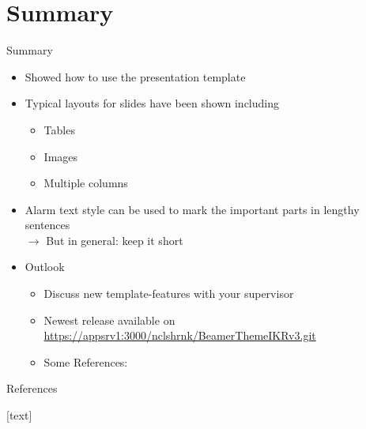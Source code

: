 \documentclass[english,american,german,aspectratio=169]{beamer}
\begin{document}
\section{Summary}
\begin{frame}{Summary}

  \begin{itemize}
    \item Showed how to use the \alert{presentation template}
    \item \alert{Typical layouts} for slides have been shown including

      \begin{itemize}
        \item Tables
        \item Images
        \item Multiple columns
      \end{itemize}
    \item Alarm text style can be used to mark the \alert{important parts}
      in lengthy sentences\\
      $\mathit{\rightarrow}$ But in general: keep it short
  \end{itemize}
  \medskip{}

  \begin{itemize}
    \item Outlook

      \begin{itemize}
        \item Discuss new template-features with your supervisor
        \item Newest release available on
          \url{https://appsrv1:3000/nclshrnk/BeamerThemeIKRv3.git}
        \item Some References:
          \cite{Kuo:1981,IEEE:14/1193r0,IEEE:15/0919r1,Jones:2015,Ling:2015,Yang:2015,Zhang:2015}
      \end{itemize}
  \end{itemize}
\end{frame}
\breadcrumbsoff

\begin{frame}[noframenumbering]{References}

  \vspace{-2.15em}
  \begin{multicols}{2}
    [text]

    {\scriptsize{}
      
    }{\scriptsize\par}

  \end{multicols}

  \beginbackup
\end{frame}
\end{document}
